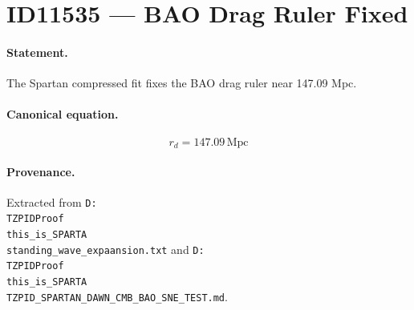 \section*{ID11535 --- BAO Drag Ruler Fixed}

\paragraph{Statement.}
The Spartan compressed fit fixes the BAO drag ruler near 147.09 Mpc.

\paragraph{Canonical equation.}
\[
r_d=147.09\,\mathrm{Mpc}
\]

\paragraph{Provenance.}
Extracted from \texttt{D:\\TZPIDProof\\this\_is\_SPARTA\\standing\_wave\_expaansion.txt} and \texttt{D:\\TZPIDProof\\this\_is\_SPARTA\\TZPID\_SPARTAN\_DAWN\_CMB\_BAO\_SNE\_TEST.md}.
